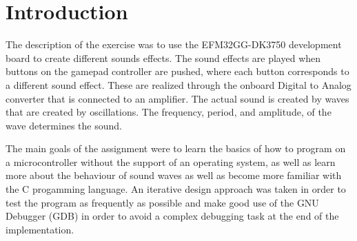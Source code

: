 \section{Introduction}
The description of the exercise was to use the EFM32GG-DK3750 development board to create different sounds effects. The sound effects are played when buttons on the gamepad controller are pushed, where each button corresponds to a different sound effect. These are realized through the onboard Digital to Analog converter that is connected to an amplifier. The actual sound is created by waves that are created by oscillations. The frequency, period, and amplitude, of the wave determines the sound. 

The main goals of the assignment were to learn the basics of how to program on a microcontroller without the support of an operating system, as well as learn more about the behaviour of sound waves as well as become more familiar with the C progamming language. An iterative design approach was taken in order to test the program as frequently as possible and make good use of the GNU Debugger (GDB) in order to avoid a complex debugging task at the end of the implementation.






    

